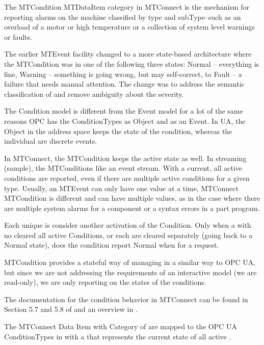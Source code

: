 The \gls{MTCondition} \gls{MTDataItem} \gls{category} in MTConnect is the mechanism for reporting alarms on the machine classified by type and subType--such as an overload of a motor or high temperature or a collection of system level warnings or faults.

The earlier  \gls{MTEvent} facility changed to a more state-based architecture where the \gls{MTCondition} was in one of the following three states: Normal – everything is fine, Warning – something is going wrong, but may self-correct, to Fault – a failure that needs manual attention. The change was to address the semantic classification of  and remove ambiguity about the  severity.

The Condition model is different from the Event model for a lot of the same reasons OPC has the \glspl{ConditionType} as \gls{Object} and as an \gls{Event}. In UA, the \gls{Object} in the address space keeps the state of the condition, whereas the individual  are discrete events.

In MTConnect, the \gls{MTCondition} keeps the active state as well. In streaming (\gls{sample}), the \glspl{MTCondition} like an event stream. With a \gls{current}, all active conditions are reported, even if there are multiple active conditions for a given type. Usually, an \gls{MTEvent} can only have one value at a time, MTConnect \gls{MTCondition} is different and can have multiple values, as in the case where there are multiple system alarms for a component or a syntax errors in a part program.

Each unique  is consider another activation of the Condition. Only when a  with no  cleared all active Conditions, or each are cleared separately (going back to a Normal state), does the condition report Normal when for a  request.

\gls{MTCondition} provides a stateful way of managing  in a similar way to OPC UA, but since we are not addressing the requirements of an interactive model (we are read-only), we are only reporting on the states of the conditions. 

The documentation for the condition behavior in MTConnect can be found in Section 5.7 and 5.8 of \cite{MTCPart3} and an overview in \cite{MTCPart2}.

The MTConnect Data Item with Category of  are mapped to the OPC UA \glspl{ConditionType} in \cite{UAPart9} with a  that represents the current state of all active .

